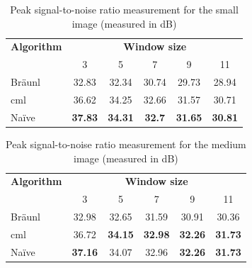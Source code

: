 \begin{table}
\centering
\caption[Peak signal-to-noise for the small image]{Peak signal-to-noise ratio measurement for the small image (measured in dB)}
\label{tab:median:psnrsmall}
\begin{tabular}{@{}lccccc@{}}
\toprule
\multicolumn{1}{c}{\textbf{Algorithm}} & \multicolumn{5}{c}{\textbf{Window size}}                                          \\
                                       & 3              & 5              & 7             & 9              & 11             \\ \midrule
Bräunl                                 & 32.83          & 32.34          & 30.74         & 29.73          & 28.94          \\
\gls{cml}                                    & 36.62          & 34.25          & 32.66         & 31.57          & 30.71          \\
Naïve                                  & \textbf{37.83} & \textbf{34.31} & \textbf{32.7} & \textbf{31.65} & \textbf{30.81} \\ \bottomrule
\end{tabular}
\end{table}

\begin{table}
\centering
\caption[Peak signal-to-noise for the medium image]{Peak signal-to-noise ratio measurement for the medium image (measured in dB)}
\begin{tabular}{@{}lccccc@{}}
\toprule
\multicolumn{1}{c}{\textbf{Algorithm}} & \multicolumn{5}{c}{\textbf{Window size}}                                           \\
                                       & 3              & 5              & 7              & 9              & 11             \\ \midrule
Bräunl                                 & 32.98          & 32.65          & 31.59          & 30.91          & 30.36          \\
\gls{cml}                                    & 36.72          & \textbf{34.15} & \textbf{32.98} & \textbf{32.26} & \textbf{31.73} \\
Naïve                                  & \textbf{37.16} & 34.07          & 32.96          & \textbf{32.26} & \textbf{31.73} \\ \bottomrule
\end{tabular}
\label{tab:median:psnrmedium}
\end{table}

